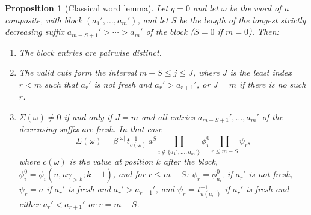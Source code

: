 \documentclass[11pt]{article}
\newtheorem{proposition}{Proposition}
\begin{document}
\begin{proposition}[Classical word lemma]\label{prop:classical-word}
Let $q=0$ and let $\omega$ be the word of a composite, with block
$(a_1',\ldots,a_m')$, and let $S$ be the length of the longest
strictly decreasing suffix $a_{m-S+1}'>\cdots>a_m'$ of the block
($S=0$ if $m=0$). Then:
\begin{enumerate}
\item The block entries are pairwise distinct.
\item The valid cuts form the interval $m-S\leq j\leq J$, where $J$ is
 the least index $r<m$ such that $a_r'$ is not fresh and
 $a_r'>a_{r+1}'$, or $J=m$ if there is no such $r$.
\item $\Sigma(\omega)\neq0$ if and only if $J=m$ and all entries
 $a_{m-S+1}',\ldots,a_m'$ of the decreasing suffix are fresh. In that
 case
 \[
  \Sigma(\omega)
  =\beta^{|\omega|}\,t_{c(\omega)}^{-1}\,a^{S}
   \prod_{i\notin\{a_1',\ldots,a_m'\}}\phi_i^{0}
   \prod_{r\leq m-S}\psi_r ,
 \]
 where $c(\omega)$ is the value at position $k$ after the block,
 $\phi_i^0=\phi_i(u,u\gamma_{>k};k-1)$, and for $r\leq m-S$:
 $\psi_r=\phi^0_{a_r'}$ if $a_r'$ is not fresh, $\psi_r=a$ if $a_r'$ is
 fresh and $a_r'>a_{r+1}'$, and $\psi_r=t_{u(a_r')}^{-1}$ if $a_r'$ is
 fresh and either $a_r'<a_{r+1}'$ or $r=m-S$.
\end{enumerate}
\end{proposition}
\end{document}
